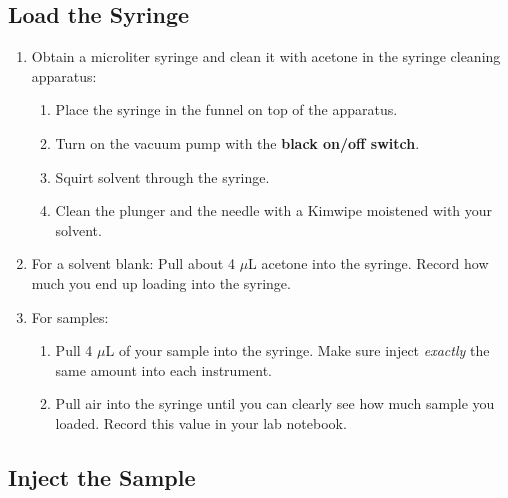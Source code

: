 \documentclass[]{tufte-book}
\providecommand{\tightlist}{%
  \setlength{\itemsep}{0pt}\setlength{\parskip}{0pt}}
\begin{document}
\hypertarget{load-the-syringe}{%
\subsection{Load the Syringe}\label{load-the-syringe}}

\begin{enumerate}
\def\labelenumi{\arabic{enumi}.}
\tightlist
\item
  Obtain a microliter syringe and clean it with acetone in the syringe cleaning apparatus:

  \begin{enumerate}
  \def\labelenumii{\arabic{enumii}.}
  \tightlist
  \item
    Place the syringe in the funnel on top of the apparatus.\\
  \item
    Turn on the vacuum pump with the \textbf{black on/off switch}.\\
  \item
    Squirt solvent through the syringe.\\
  \item
    Clean the plunger and the needle with a Kimwipe moistened with your solvent.\\
  \end{enumerate}
\item
  For a solvent blank: Pull about 4 \(\mu\)L acetone into the syringe. Record how much you end up loading into the syringe.
\item
  For samples:

  \begin{enumerate}
  \def\labelenumii{\arabic{enumii}.}
  \tightlist
  \item
    Pull 4 \(\mu\)L of your sample into the syringe. Make sure inject \emph{exactly} the same amount into each instrument.
  \item
    Pull air into the syringe until you can clearly see how much sample you loaded. Record this value in your lab notebook.
  \end{enumerate}
\end{enumerate}

\hypertarget{inject-the-sample}{%
\subsection{Inject the Sample}\label{inject-the-sample}}
\end{document}
